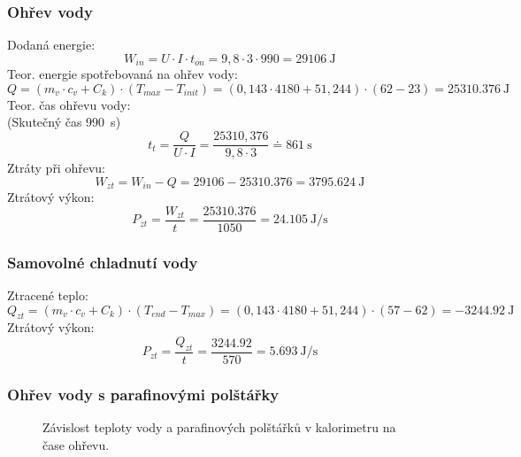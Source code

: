 \documentclass{protokol}
\begin{document}
\subsubsection{Ohřev vody}
Dodaná energie: 
 \[
	W_{in}=U\cdot I \cdot t_{on}  = 9,8\cdot 3\cdot 990 = \qty{29106}{\joule}
 \]
Teor. energie spotřebovaná na ohřev vody: 
 \[
	Q=(m_{v} \cdot c_{v}+C_{k} ) \cdot (T_{max}-T_{init}) = (0,143 \cdot 4180 + 51,244) \cdot (62-23) = \qty{25310.376}{\joule}
 \]
 Teor. čas ohřevu vody: 
 \\
 (Skutečný čas \qty{990}{s})
 \[
	t_{t} = \frac{Q}{U\cdot I}=\frac{25310,376}{9,8\cdot 3}\doteq\qty{861}{\second}
 \]
Ztráty při ohřevu: 
\[
	W_{zt} = W_{in} -Q= \num{29106}-\num{25310.376}=\qty{3795,624}{\joule}
\]
Ztrátový výkon: 
\[
	P_{zt} =  \frac{W_{zt}}{t}=\frac{25310.376}{1050}=\qty{24,105}{\joule\per\second}
\]

\subsubsection{Samovolné chladnutí vody }
Ztracené teplo: 
\[
	Q_{zt} = (m_{v} \cdot c_{v}+C_{k} ) \cdot (T_{end}-T_{max}) = (0,143 \cdot 4180 + 51,244) \cdot (57-62) = \qty{-3244.92}{\joule}
\]
Ztrátový výkon: 
\[
	P_{zt} =  \frac{Q_{zt}}{t}=\frac{3244.92}{570}=\qty{5,693}{\joule\per\second}
\]

\subsubsection{Ohřev vody s parafinovými polštářky}

\begin{figure*}[h!]
	\caption{Závislost teploty vody a parafinových polštářků v kalorimetru na čase ohřevu.}
\end{figure*}
\end{document}
